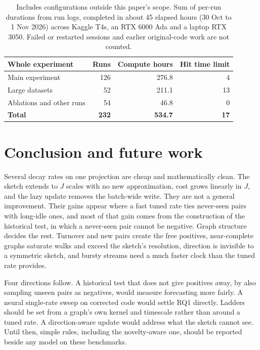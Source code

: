 \documentclass[11pt,a4paper]{article}
\theoremstyle{plain}
\theoremstyle{definition}
\begin{document}
\begin{table}[H]\centering\small
\begin{tabular}{lrrr}
\toprule
Whole experiment & Runs & Compute hours & Hit time limit\\
\midrule
Main experiment & 126 & 276.8 & 4\\
Large datasets & 52 & 211.1 & 13\\
Ablations and other runs & 54 & 46.8 & 0\\
\midrule
\textbf{Total} & \textbf{232} & \textbf{534.7} & \textbf{17}\\
\bottomrule
\end{tabular}
\caption{Includes configurations outside this paper's scope. Sum of per-run durations from run logs, completed in about 45 elapsed hours (30 Oct to 1 Nov 2026) across Kaggle T4s, an RTX 6000 Ada and a laptop RTX 3050. Failed or restarted sessions and earlier original-code work are not counted.}\label{tab:time}
\end{table}

\section{Conclusion and future work}\label{sec:end}
Several decay rates on one projection are cheap and mathematically clean. The sketch extends to $J$ scales with no new approximation, cost grows linearly in $J$, and the lazy update removes the batch-wide write. They are not a general improvement. Their gains appear where a fast tuned rate ties never-seen pairs with long-idle ones, and most of that gain comes from the construction of the historical test, in which a never-seen pair cannot be negative. Graph structure decides the rest. Turnover and new pairs create the free positives, near-complete graphs saturate walks and exceed the sketch's resolution, direction is invisible to a symmetric sketch, and bursty streams need a much faster clock than the tuned rate provides.

Four directions follow. A historical test that does not give positives away, by also sampling unseen pairs as negatives, would measure forecasting more fairly. A neural single-rate sweep on corrected code would settle RQ1 directly. Ladders should be set from a graph's own kernel and timescale rather than around a tuned rate. A direction-aware update would address what the sketch cannot see. Until then, simple rules, including the novelty-aware one, should be reported beside any model on these benchmarks.
\end{document}
